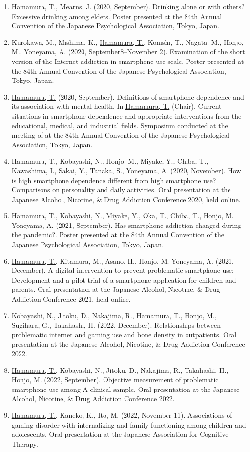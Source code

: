 \documentclass[a4paper]{article}
\begin{document}
\begin{enumerate}
	\item \underline{Hamamura, T.}, Mearns, J. (2020, September). Drinking alone or with others? Excessive drinking among elders. Poster presented at the 84th Annual Convention of the Japanese Psychological Association, Tokyo, Japan.
	\item Kurokawa, M., Mishima, K., \underline{Hamamura, T.}, Konishi, T., Nagata, M., Honjo, M., Yoneyama, A. (2020, September8--November 2). Examination of the short version of the Internet addiction in smartphone use scale. Poster presented at the 84th Annual Convention of the Japanese Psychological Association, Tokyo, Japan.
	\item \underline{Hamamura, T.} (2020, September).  Definitions of smartphone dependence and its association with mental health.	In \underline{Hamamura, T.} (Chair). Current situations in smartphone dependence and appropriate interventions from the educational, medical, and industrial fields. Symposium conducted at the meeting of at the 84th Annual Convention of the Japanese Psychological Association, Tokyo, Japan.
	\item \underline{Hamamura, T.}, Kobayashi, N., Honjo, M., Miyake, Y., Chiba, T., Kawashima, I., Sakai, Y., Tanaka, S., Yoneyama, A. (2020, November). How is high smartphone dependence different from high smartphone use? Comparisons on personality and daily activities. Oral presentation at the Japanese Alcohol, Nicotine, \& Drug Addiction Conference 2020, held online.
	\item \underline{Hamamura, T.}, Kobayashi, N., Miyake, Y., Oka, T., Chiba, T., Honjo, M. Yoneyama, A. (2021, September). Has smartphone addiction changed during the pandemic?. Poster presented at the 84th Annual Convention of the Japanese Psychological Association, Tokyo, Japan.
	\item \underline{Hamamura, T.}, Kitamura, M., Asano, H., Honjo, M. Yoneyama, A. (2021, December). A digital intervention to prevent problematic smartphone use: Development and a pilot trial of a smartphone application for children and parents. Oral presentation at the Japanese Alcohol, Nicotine, \& Drug Addiction Conference 2021, held online.
	\item Kobayashi, N., Jitoku, D., Nakajima, R., \underline{Hamamura, T.}, Honjo, M., Sugihara, G., Takahashi, H. (2022, December). Relationships between problematic internet and gaming use and bone density in outpatients. Oral presentation at the Japanese Alcohol, Nicotine, \& Drug Addiction Conference 2022.
	\item \underline{Hamamura, T.}, Kobayashi, N., Jitoku, D., Nakajima, R., Takahashi, H., Honjo, M. (2022, September). Objective measurement of problematic smartphone use among A clinical sample. Oral presentation at the Japanese Alcohol, Nicotine, \& Drug Addiction Conference 2022.
	\item \underline{Hamamura, T.}, Kaneko, K., Ito, M. (2022, November 11). Associations of gaming disorder with internalizing and family functioning among children and adolescents. Oral presentation at the Japanese Association for Cognitive Therapy.
\end{enumerate}
\end{document}
